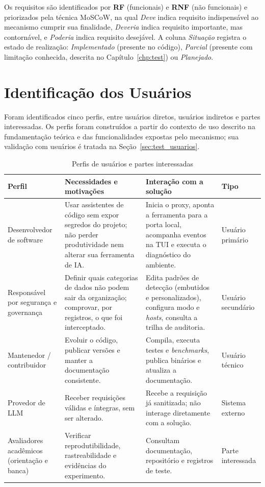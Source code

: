 Os requisitos são identificados por \textbf{RF} (funcionais) e \textbf{RNF} (não funcionais) e priorizados pela técnica MoSCoW, na qual \textit{Deve} indica requisito indispensável ao mecanismo cumprir sua finalidade, \textit{Deveria} indica requisito importante, mas contornável, e \textit{Poderia} indica requisito desejável. A coluna \textit{Situação} registra o estado de realização: \textit{Implementado} (presente no código), \textit{Parcial} (presente com limitação conhecida, descrita no Capítulo~\ref{chp:test}) ou \textit{Planejado}.


\section{Identificação dos Usuários}
\label{sec:req_usuarios}

Foram identificados cinco perfis, entre usuários diretos, usuários indiretos e partes interessadas. Os perfis foram construídos a partir do contexto de uso descrito na fundamentação teórica e das funcionalidades expostas pelo mecanismo; sua validação com usuários é tratada na Seção~\ref{sec:test_usuarios}.

\begin{table}[htb]
\centering
\caption{Perfis de usuários e partes interessadas}\label{tab:usuarios}
\small
\begin{tabular}{|p{3.1cm}|p{4.6cm}|p{4.6cm}|p{2.6cm}|}
\hline
\textbf{Perfil} & \textbf{Necessidades e motivações} & \textbf{Interação com a solução} & \textbf{Tipo} \\ \hline
Desenvolvedor de software & Usar assistentes de código sem expor segredos do projeto; não perder produtividade nem alterar sua ferramenta de IA. & Inicia o proxy, aponta a ferramenta para a porta local, acompanha eventos na TUI e executa o diagnóstico do ambiente. & Usuário primário \\ \hline
Responsável por segurança e governança & Definir quais categorias de dados não podem sair da organização; comprovar, por registros, o que foi interceptado. & Edita padrões de detecção (embutidos e personalizados), configura modo e \textit{hosts}, consulta a trilha de auditoria. & Usuário secundário \\ \hline
Mantenedor / contribuidor & Evoluir o código, publicar versões e manter a documentação consistente. & Compila, executa testes e \textit{benchmarks}, publica binários e atualiza a documentação. & Usuário técnico \\ \hline
Provedor de LLM & Receber requisições válidas e íntegras, sem ser alterado. & Recebe a requisição já sanitizada; não interage diretamente com a solução. & Sistema externo \\ \hline
Avaliadores acadêmicos (orientação e banca) & Verificar reprodutibilidade, rastreabilidade e evidências do experimento. & Consultam documentação, repositório e registros de teste. & Parte interessada \\ \hline
\end{tabular}
\end{table}


